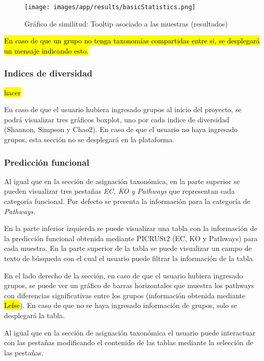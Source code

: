 \begin{figure}[H]
    \texttt{[image: images/app/results/basicStatistics.png]}

    \caption{Gráfico de similitud: Tooltip asociado a las muestras (resultados)}
    \label{fig:app-results-core-tooltip}
\end{figure}

\hl{En caso de que un grupo no tenga taxonomías compartidas entre si, se desplegará un mensaje indicando esto.}
\subsubsection{Indices de diversidad}
\hl{hacer}

En caso de que el usuario hubiera ingresado grupos al inicio del proyecto, se podrá visualizar tres gráficos boxplot, uno por cada indice de diversidad (Shannon, Simpson y Chao2). En caso de que el usuario no haya ingresado grupos, esta sección no se desplegará en la plataforma.


\subsubsection{Predicción funcional}
Al igual que en la sección de asignación taxonómica, en la parte superior se pueden visualizar tres pestañas \textit{EC, KO y Pathways} que representan cada categoría funcional. Por defecto se presenta la información para la categoría de \textit{Pathways}.

En la parte inferior izquierda se puede visualizar una tabla con la información de la predicción funcional obtenida mediante PICRUSt2 (EC, KO y Pathways) para cada muestra. 
En la parte superior de la tabla se puede visualizar un campo de texto de búsqueda con el cual el usuario puede filtrar la información de la tabla.

En el lado derecho de la sección, en caso de que el usuario hubiera ingresado grupos, se puede ver un gráfico de barras horizontales que muestra los pathways con diferencias significativas entre los grupos (información obtenida mediante \hl{Lefse}). 
En caso de que no se haya ingresado información de grupos, solo se desplegará la tabla.

Al igual que en la sección de asignación taxonómica el usuario puede interactuar con las pestañas modificando el contenido de las tablas mediante la selección de las pestañas.


